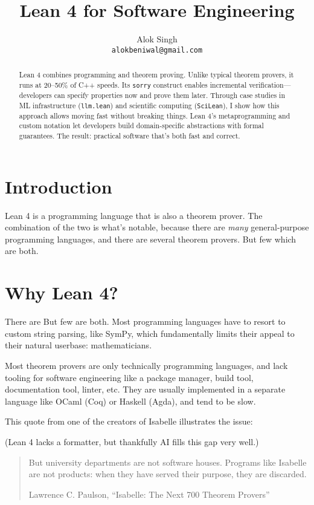 \documentclass{article}
\title{Lean 4 for Software Engineering}
\author{
  Alok Singh \\
  \texttt{alokbeniwal@gmail.com} \\
}
\begin{document}
\maketitle

\begin{abstract}
  Lean 4 combines programming and theorem proving. Unlike typical theorem provers, it runs at 20--50\% of C++ speeds. Its \texttt{sorry} construct enables incremental verification---developers can specify properties now and prove them later. Through case studies in ML infrastructure (\texttt{llm.lean}) and scientific computing (\texttt{SciLean}), I show how this approach allows moving fast without breaking things. Lean 4's metaprogramming and custom notation let developers build domain-specific abstractions with formal guarantees. The result: practical software that's both fast and correct.
\end{abstract}

\tableofcontents

\section{Introduction}

Lean 4 is a programming language that is also a theorem prover. The combination of the two is what's notable, because there are \textit{many} general-purpose programming languages, and there are several theorem provers. But few which are both.

\section{Why Lean 4?}

There are  But few are both. Most programming languages have to resort to custom string parsing, like SymPy, which fundamentally limits their appeal to their natural userbase: mathematicians.

Most theorem provers are only technically programming languages, and lack tooling for software engineering like a package manager, build tool, documentation tool, linter, etc. They are usually implemented in a separate language like OCaml (Coq) or Haskell (Agda), and tend to be slow.

This quote from one of the creators of Isabelle illustrates the issue:

(Lean 4 lacks a formatter, but thankfully AI fills this gap very well.)

\begin{quote}
  But university departments are not software houses. Programs like Isabelle are not products: when they have served
  their purpose, they are discarded. 

  Lawrence C. Paulson, ``Isabelle: The Next 700 Theorem Provers''

\end{quote}
\end{document}
